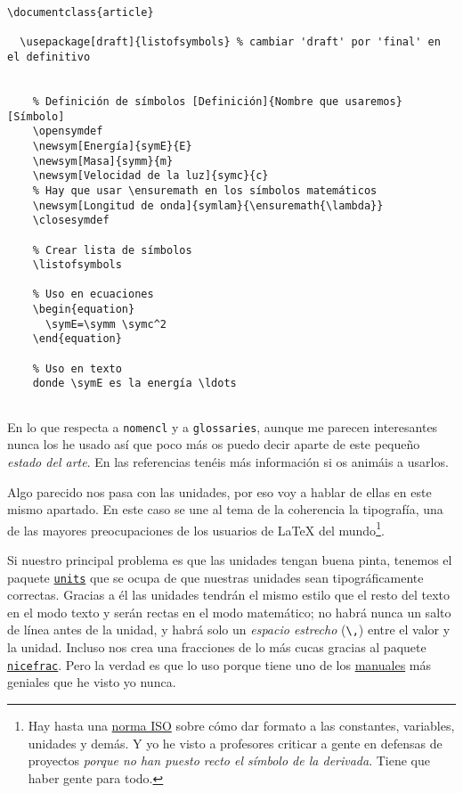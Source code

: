 \begin{lstlisting}[language={[latex]tex}]
\documentclass{article}

  \usepackage[draft]{listofsymbols} % cambiar 'draft' por 'final' en el definitivo
  

    % Definición de símbolos [Definición]{Nombre que usaremos}[Símbolo]
    \opensymdef
    \newsym[Energía]{symE}{E}
    \newsym[Masa]{symm}{m}
    \newsym[Velocidad de la luz]{symc}{c}
    % Hay que usar \ensuremath en los símbolos matemáticos
    \newsym[Longitud de onda]{symlam}{\ensuremath{\lambda}}
    \closesymdef

    % Crear lista de símbolos
    \listofsymbols

    % Uso en ecuaciones
    \begin{equation}
      \symE=\symm \symc^2
    \end{equation}

    % Uso en texto
    donde \symE es la energía \ldots


\end{lstlisting}

En lo que respecta a \lstinline!nomencl! y a \lstinline!glossaries!,
aunque me parecen interesantes nunca los he usado así que poco más os
puedo decir aparte de este pequeño \emph{estado del arte}. En las
referencias tenéis más información si os animáis a usarlos.

Algo parecido nos pasa con las unidades, por eso voy a hablar de ellas
en este mismo apartado. En este caso se une al tema de la coherencia la
tipografía, una de las mayores preocupaciones de los usuarios de LaTeX
del mundo\footnote{Hay hasta una
  \href{https://nickhigham.wordpress.com/2016/01/28/typesetting-mathematics-according-to-the-iso-standard/}{norma
  ISO} sobre cómo dar formato a las constantes, variables, unidades y
  demás. Y yo he visto a profesores criticar a gente en defensas de
  proyectos \emph{porque no han puesto recto el símbolo de la derivada}.
  Tiene que haber gente para todo.}.

Si nuestro principal problema es que las unidades tengan buena pinta,
tenemos el paquete
\href{http://www.ctan.org/tex-archive/macros/latex/contrib/units/}{\lstinline!units!}
que se ocupa de que nuestras unidades sean tipográficamente correctas.
Gracias a él las unidades tendrán el mismo estilo que el resto del texto
en el modo texto y serán rectas en el modo matemático; no habrá nunca un
salto de línea antes de la unidad, y habrá solo un \emph{espacio
estrecho} (\lstinline!\,!) entre el valor y la unidad. Incluso nos crea
una fracciones de lo más cucas gracias al paquete
\href{http://ctan.org/pkg/nicefrac}{\lstinline!nicefrac!}. Pero la
verdad es que lo uso porque tiene uno de los
\href{http://osl.ugr.es/CTAN/macros/latex/contrib/units/units.pdf}{manuales}
más geniales que he visto yo nunca.

